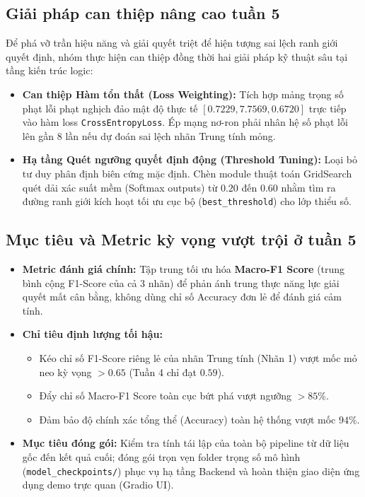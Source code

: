 \documentclass[conference,10pt,a4paper]{IEEEtran}
\begin{document}
\subsection{Giải pháp can thiệp nâng cao tuần 5}
Để phá vỡ trần hiệu năng và giải quyết triệt để hiện tượng sai lệch ranh giới quyết định, nhóm thực hiện can thiệp đồng thời hai giải pháp kỹ thuật sâu tại tầng kiến trúc logic:
\begin{itemize}
    \item \textbf{Can thiệp Hàm tổn thất (Loss Weighting):} Tích hợp mảng trọng số phạt lỗi phạt nghịch đảo mật độ thực tế $[0.7229, 7.7569, 0.6720]$ trực tiếp vào hàm loss \texttt{CrossEntropyLoss}. Ép mạng nơ-ron phải nhân hệ số phạt lỗi lên gần 8 lần nếu dự đoán sai lệch nhãn Trung tính mỏng.
    \item \textbf{Hạ tầng Quét ngưỡng quyết định động (Threshold Tuning):} Loại bỏ tư duy phân định biên cứng mặc định. Chèn module thuật toán GridSearch quét dải xác suất mềm (Softmax outputs) từ $0.20$ đến $0.60$ nhằm tìm ra đường ranh giới kích hoạt tối ưu cục bộ (\texttt{best\_threshold}) cho lớp thiểu số.
\end{itemize}

\subsection{Mục tiêu và Metric kỳ vọng vượt trội ở tuần 5}
\begin{itemize}
    \item \textbf{Metric đánh giá chính:} Tập trung tối ưu hóa \textbf{Macro-F1 Score} (trung bình cộng F1-Score của cả 3 nhãn) để phản ánh trung thực năng lực giải quyết mất cân bằng, không dùng chỉ số Accuracy đơn lẻ để đánh giá cảm tính.
    \item \textbf{Chỉ tiêu định lượng tối hậu:}
    \begin{itemize}
        \item Kéo chỉ số F1-Score riêng lẻ của nhãn Trung tính (Nhãn 1) vượt mốc mỏ neo kỳ vọng $> 0.65$ (Tuần 4 chỉ đạt $0.59$).
        \item Đẩy chỉ số Macro-F1 Score toàn cục bứt phá vượt ngưỡng $> 85\%$.
        \item Đảm bảo độ chính xác tổng thể (Accuracy) toàn hệ thống vượt mốc $94\%$.
    \end{itemize}
    \item \textbf{Mục tiêu đóng gói:} Kiểm tra tính tái lập của toàn bộ pipeline từ dữ liệu gốc đến kết quả cuối; đóng gói trọn vẹn folder trọng số mô hình (\texttt{model\_checkpoints/}) phục vụ hạ tầng Backend và hoàn thiện giao diện ứng dụng demo trực quan (Gradio UI).
\end{itemize}
\end{document}
